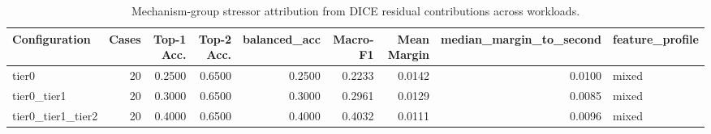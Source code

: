 \begin{table}[t]
\centering
\caption{Mechanism-group stressor attribution from DICE residual contributions across workloads.}
\label{tab:dice_stressor_diagnosis}
\footnotesize
\begin{tabular}{lrrrrrrrl}
\toprule
Configuration & Cases & Top-1 Acc. & Top-2 Acc. & balanced_acc & Macro-F1 & Mean Margin & median_margin_to_second & feature_profile \\
\midrule
tier0 & 20 & 0.2500 & 0.6500 & 0.2500 & 0.2233 & 0.0142 & 0.0100 & mixed \\
tier0_tier1 & 20 & 0.3000 & 0.6500 & 0.3000 & 0.2961 & 0.0129 & 0.0085 & mixed \\
tier0_tier1_tier2 & 20 & 0.4000 & 0.6500 & 0.4000 & 0.4032 & 0.0111 & 0.0096 & mixed \\
\bottomrule
\end{tabular}

\end{table}
